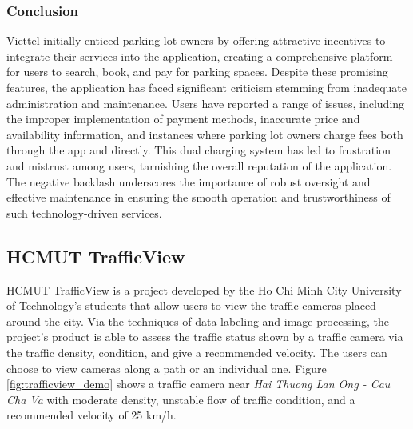 \subsubsection{Conclusion}

Viettel initially enticed parking lot owners by offering attractive incentives to integrate their services into the application, creating a comprehensive platform for users to search, book, and pay for parking spaces. Despite these promising features, the application has faced significant criticism stemming from inadequate administration and maintenance. Users have reported a range of issues, including the improper implementation of payment methods, inaccurate price and availability information, and instances where parking lot owners charge fees both through the app and directly. This dual charging system has led to frustration and mistrust among users, tarnishing the overall reputation of the application. The negative backlash underscores the importance of robust oversight and effective maintenance in ensuring the smooth operation and trustworthiness of such technology-driven services.

\subsection{HCMUT TrafficView}
HCMUT TrafficView is a project developed by the Ho Chi Minh City University of Technology's students that allow users to view the traffic cameras placed around the city. Via the techniques of data labeling and image processing, the project's product is able to assess the traffic status shown by a traffic camera via the traffic density, condition, and give a recommended velocity. The users can choose to view cameras along a path or an individual one. \cite{hcmut_trafficview} Figure \ref{fig:trafficview_demo} shows a traffic camera near \textit{Hai Thuong Lan Ong - Cau Cha Va} with moderate density, unstable flow of traffic condition, and a recommended velocity of 25 km/h.

